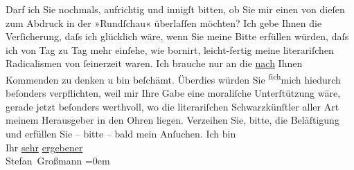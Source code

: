 \begin{ledgroupsized}[t]{13cm}
           \pstart
           Darf ich Sie nochmals, aufrichtig und innigſt bitten, ob Sie mir einen von dieſen zum
               Abdruck in der »Rundſchau« überlaſſen möchten? Ich
               gebe Ihnen die Verſicherung, daſs ich glücklich wäre, wenn Sie meine Bitte erfüllen
               würden, daſs ich von Tag zu Tag \strikeout{\textcolor{gray}{×}\-\textcolor{gray}{×}} mehr einſehe, wie bornirt, leicht-fertig meine  literariſchen Radicalismen von ſeinerzeit waren.
               Ich brauche nur an die \uline{nach} Ihnen Kommenden zu denken
               u bin beſchämt.\pend
           \pstart
           Überdies würden Sie \substVorne{}\textsuperscript{ſich}\substDazwischen{}mich\substHinten{} hiedurch beſonders verpflichten, weil mir Ihre Gabe eine moraliſche Unter{\pb}ſtützung wäre, gerade jetzt beſonders
               werthvoll, wo die literariſchen Schwarzkünſtler aller Art meinem Herausgeber in den
               Ohren liegen.\pend
           \pstart
           Verzeihen Sie, bitte, die Beläſtigung und erfüllen Sie – bitte – bald mein
               Anſuchen.\pend
           \pstart
           Ich bin{\\[\baselineskip]} Ihr \uline{sehr}{ }\uline{ergebener}{\\[\baselineskip]}\spacefill\mbox{Stefan Großmann}\pend
           \leftskip=0em{}
         
         \endnumbering{}\end{ledgroupsized}  \newcommand{\dateiname}{L00847}\newcommand{\titel}{Stefan Großmann an Arthur Schnitzler, 16. 9. 1898}\newcommand{\editorInnen}{ Martin Anton Müller und Gerd-Hermann Susen}
      